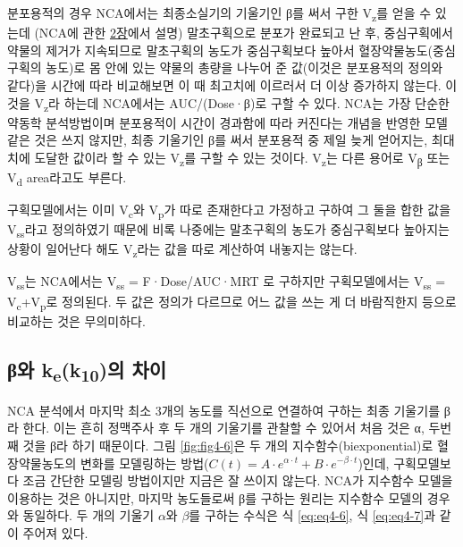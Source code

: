 \documentclass[
  11pt,
  krantz2, a4paper, twoside]{krantz}
\theoremstyle{definition}
\theoremstyle{definition}
\theoremstyle{definition}
\theoremstyle{definition}
\theoremstyle{remark}
\begin{document}

분포용적의 경우 NCA에서는 최종소실기의 기울기인 β를 써서 구한 V\textsubscript{z}를
얻을 수 있는데 (NCA에 관한 \hyperref[nca-principle]{2장}에서 설명) 말초구획으로 분포가 완료되고 난
후, 중심구획에서 약물의 제거가 지속되므로 말초구획의 농도가 중심구획보다
높아서 혈장약물농도(중심구획의 농도)로 몸 안에 있는 약물의 총량을 나누어
준 값(이것은 분포용적의 정의와 같다)을 시간에 따라 비교해보면 이 때
최고치에 이르러서 더 이상 증가하지 않는다. 이것을 V\textsubscript{z}라 하는데
NCA에서는 AUC/(Dose·β)로 구할 수 있다. NCA는 가장 단순한 약동학
분석방법이며 분포용적이 시간이 경과함에 따라 커진다는 개념을 반영한 모델
같은 것은 쓰지 않지만, 최종 기울기인 β를 써서 분포용적 중 제일 늦게
얻어지는, 최대치에 도달한 값이라 할 수 있는 V\textsubscript{z}를 구할 수 있는 것이다. V\textsubscript{z}는 다른
용어로 V\textsubscript{β} 또는 V\textsubscript{d} area라고도 부른다.

구획모델에서는 이미 V\textsubscript{c}와 V\textsubscript{p}가 따로 존재한다고 가정하고 구하여 그
둘을 합한 값을 V\textsubscript{ss}라고 정의하였기 때문에 비록 나중에는 말초구획의
농도가 중심구획보다 높아지는 상황이 일어난다 해도 V\textsubscript{z}라는 값을 따로
계산하여 내놓지는 않는다.

V\textsubscript{ss}는 NCA에서는 V\textsubscript{ss} = F·Dose/AUC·MRT 로 구하지만 구획모델에서는
V\textsubscript{ss} = V\textsubscript{c}+V\textsubscript{p}로 정의된다. 두 값은 정의가 다르므로 어느 값을 쓰는 게
더 바람직한지 등으로 비교하는 것은 무의미하다.

\subsection{\texorpdfstring{β와 k\textsubscript{e}(k\textsubscript{10})의 차이}{β와 ke(k10)의 차이}}\label{ux3b2uxc640-kek10uxc758-uxcc28uxc774}

NCA 분석에서 마지막 최소 3개의 농도를 직선으로 연결하여 구하는 최종 기울기를 β라 한다.
이는 흔히 정맥주사 후 두 개의 기울기를 관찰할 수 있어서 처음 것은 α, 두번째 것을 β라 하기 때문이다.
그림 \ref{fig:fig4-6}은 두 개의 지수함수(biexponential)로 혈장약물농도의 변화를 모델링하는 방법(\(C(t) = A \cdot e^{\alpha \cdot t} + B \cdot e^{-\beta \cdot t}\))인데, 구획모델보다 조금 간단한 모델링 방법이지만 지금은 잘 쓰이지 않는다.
NCA가 지수함수 모델을 이용하는 것은 아니지만, 마지막 농도들로써 β를 구하는 원리는 지수함수 모델의 경우와 동일하다.
두 개의 기울기 \(\alpha\)와 \(\beta\)를 구하는 수식은 식 \eqref{eq:eq4-6}, 식 \eqref{eq:eq4-7}과 같이 주어져 있다.
\end{document}
